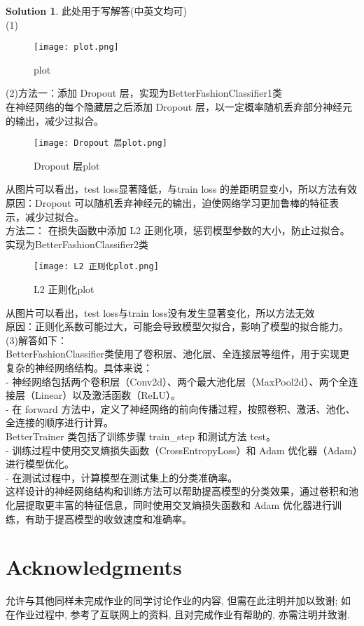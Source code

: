 \documentclass[a4paper,UTF8]{article}
\numberwithin{equation}{section}
\theoremstyle{definition}
\newtheorem*{solution}{Solution}
\begin{document}
\begin{solution} 此处用于写解答(中英文均可)
    ~\\
(1)
 \begin{figure}[H]
    \centering
    \texttt{[image: plot.png]}\\
    \caption{plot}
    \label{fig:roc}
\end{figure}
(2)方法一：添加 Dropout 层，实现为BetterFashionClassifier1类\\
   在神经网络的每个隐藏层之后添加 Dropout 层，以一定概率随机丢弃部分神经元的输出，减少过拟合。
    \begin{figure}[H]
    \centering
    \texttt{[image: Dropout 层plot.png]}\\
    \caption{Dropout 层plot}
    \label{fig:roc}
\end{figure}
   从图片可以看出，test loss显著降低，与train loss 的差距明显变小，所以方法有效\\
   原因：Dropout 可以随机丢弃神经元的输出，迫使网络学习更加鲁棒的特征表示，减少过拟合。\\
方法二： 在损失函数中添加 L2 正则化项，惩罚模型参数的大小，防止过拟合。实现为BetterFashionClassifier2类
    \begin{figure}[H]
    \centering
    \texttt{[image: L2 正则化plot.png]}\\
    \caption{L2 正则化plot}
    \label{fig:roc}
\end{figure}
从图片可以看出，test loss与train loss没有发生显著变化，所以方法无效\\
原因：正则化系数可能过大，可能会导致模型欠拟合，影响了模型的拟合能力。\\
(3)解答如下：\\
BetterFashionClassifier类使用了卷积层、池化层、全连接层等组件，用于实现更复杂的神经网络结构。具体来说：\\
- 神经网络包括两个卷积层（Conv2d）、两个最大池化层（MaxPool2d）、两个全连接层（Linear）以及激活函数（ReLU）。\\
- 在 forward 方法中，定义了神经网络的前向传播过程，按照卷积、激活、池化、全连接的顺序进行计算。\\
BetterTrainer 类包括了训练步骤 train\_step 和测试方法 test。\\
- 训练过程中使用交叉熵损失函数（CrossEntropyLoss）和 Adam 优化器（Adam）进行模型优化。\\
- 在测试过程中，计算模型在测试集上的分类准确率。\\
这样设计的神经网络结构和训练方法可以帮助提高模型的分类效果，通过卷积和池化层提取更丰富的特征信息，同时使用交叉熵损失函数和 Adam 优化器进行训练，有助于提高模型的收敛速度和准确率。
\end{solution}

\newpage

\section*{Acknowledgments}
允许与其他同样未完成作业的同学讨论作业的内容, 但需在此注明并加以致谢; 如在作业过程中, 参考了互联网上的资料, 且对完成作业有帮助的, 亦需注明并致谢.
\end{document}

